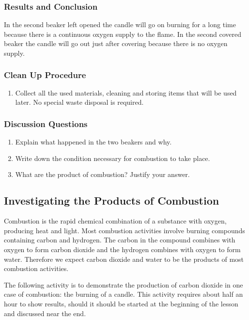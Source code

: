 \subsubsection*{Results and Conclusion}
In the second beaker left opened the candle will go on burning for a long time because there is a continuous oxygen supply to the flame. In the second covered beaker the candle will go out just after covering because there is no oxygen supply.

\subsubsection*{Clean Up Procedure}
\begin{enumerate}
\item{Collect all the used materials, cleaning and storing items that will be used later. No special waste disposal is required.}
\end{enumerate}

\subsubsection*{Discussion Questions}
\begin{enumerate}
\item{Explain what happened in the two beakers and why.}
\item{Write down the condition necessary for combustion to take place.}
\item{What are the product of  combustion? Justify your answer.}
\end{enumerate}


\subsection{Investigating the Products of Combustion}

Combustion is the rapid chemical combination of a substance with oxygen, producing heat and light. Most combustion activities involve burning compounds containing carbon and hydrogen. The carbon in the compound combines with oxygen to form carbon dioxide and the hydrogen combines with oxygen to form water. Therefore we expect carbon dioxide and water to be the products of most combustion activities.

The following activity is to demonstrate the production of carbon dioxide in one case of combustion: the burning of a candle. This activity requires about half an hour to show results, should it should be started at the beginning of the lesson and discussed near the end.

